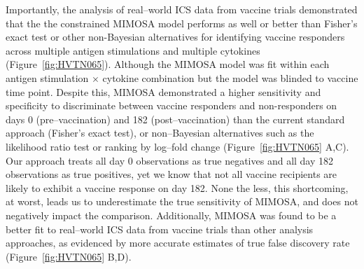 \documentclass[11pt]{article}
\begin{document}
Importantly, the analysis of real--world ICS data from vaccine trials demonstrated that the the constrained MIMOSA model performs as well or better than Fisher's exact test or other non-Bayesian alternatives for identifying vaccine responders across multiple antigen stimulations and multiple cytokines (Figure~\ref{fig:HVTN065}). Although the MIMOSA model was fit within each antigen stimulation $\times$ cytokine combination but the model was blinded to vaccine time point. Despite this, MIMOSA demonstrated a higher sensitivity and specificity to discriminate between vaccine responders and non-responders on days 0 (pre--vaccination) and 182 (post--vaccination) than the current standard approach (Fisher's exact test), or non--Bayesian alternatives such as the likelihood ratio test or ranking by log--fold change (Figure~\ref{fig:HVTN065} A,C). Our approach treats all day 0 observations as true negatives and all day 182 observations as true positives, yet we know that not all vaccine recipients are likely to exhibit a vaccine response on day 182. None the less, this shortcoming, at worst, leads us to underestimate the true sensitivity of MIMOSA, and does not negatively impact the comparison. Additionally, MIMOSA was found to be a better fit to real--world ICS data from vaccine trials than other analysis approaches, as evidenced by more accurate estimates of true false discovery rate (Figure~\ref{fig:HVTN065} B,D).

\end{document}
